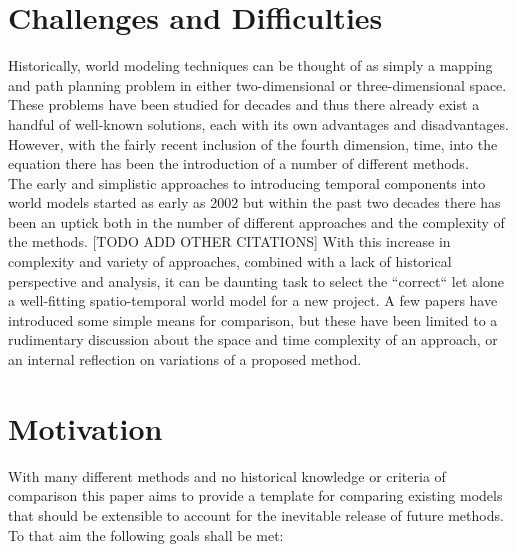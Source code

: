   \section{ Challenges and Difficulties }

  Historically, world modeling techniques can be thought of as simply a mapping
  and path planning problem in either two-dimensional or three-dimensional space.
  These problems have been studied for decades and thus there already exist a
  handful of well-known solutions, each with its own advantages and
  disadvantages. However, with the fairly recent inclusion of the fourth
  dimension, time, into the equation there has been the introduction of a number
  of different methods. \\

  The early and simplistic approaches to introducing temporal components into
  world models started as early as 2002 \cite{Arbuckle2002} but within the past
  two decades there has been an uptick both in the number of different
  approaches and the complexity of the methods. \cite{Krajnik2017} [TODO ADD
  OTHER CITATIONS] With this increase in complexity and variety of approaches,
  combined with a lack of historical perspective and analysis, it can be
  daunting task to select the ``correct`` let alone a well-fitting spatio-temporal
  world model for a new project. A few papers have introduced some simple means
  for comparison, but these have been limited to a rudimentary discussion about the
  space and time complexity of an approach, or an internal reflection on
  variations of a proposed method.


  \section{ Motivation }
  With many different methods and no historical knowledge or criteria of comparison
  this paper aims to provide a template for comparing existing models that should
  be extensible to account for the inevitable release of future methods. To that
  aim the following goals shall be met:

